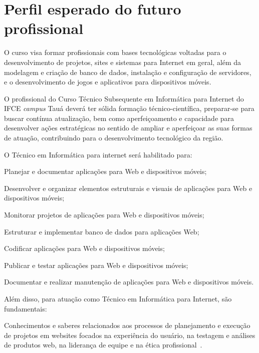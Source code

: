 \documentclass[
	12pt,				%
	openright,			%
	twoside,			%
	a4paper,			%
	chapter=TITLE,		%
	english,			%
	french,				%
	spanish,			%
	brazil,				%
	]{abntex2}
\begin{document}
\chapter{Perfil esperado do futuro profissional}


O curso visa formar profissionais com bases tecnológicas voltadas para o desenvolvimento de projetos, sites e sistemas para Internet em geral, além da modelagem e criação de banco de dados, instalação e configuração de servidores, e o desenvolvimento de jogos e aplicativos para dispositivos móveis.

O profissional do Curso Técnico Subsequente em Informática para Internet do IFCE \textit{campus} Tauá deverá ter sólida formação técnico-científica, preparar-se para buscar contínua atualização, bem como aperfeiçoamento e capacidade para desenvolver ações estratégicas no sentido de ampliar e aperfeiçoar as suas formas de atuação, contribuindo para o desenvolvimento tecnológico da região.


O Técnico em Informática para internet será habilitado para:
\begin{alineas}
	\item Planejar e documentar aplicações para Web e dispositivos móveis;
	\item Desenvolver e organizar elementos estruturais e visuais de aplicações para Web e dispositivos móveis;
	\item Monitorar projetos de aplicações para Web e dispositivos móveis;
	\item Estruturar e implementar banco de dados para aplicações Web;
	\item Codificar aplicações para Web e dispositivos móveis;
	\item Publicar e testar aplicações para Web e dispositivos móveis;
	\item Documentar e realizar manutenção de aplicações para Web e dispositivos móveis.
\end{alineas}

Além disso, para atuação como Técnico em Informática para Internet, são fundamentais:

\begin{citacao}
Conhecimentos e saberes relacionados aos processos de planejamento e execução de projetos em websites focados na experiência do usuário, na testagem e análises de produtos web, na liderança de equipe e na ética profissional~\cite{catalog}.
\end{citacao}
 
\end{document}

